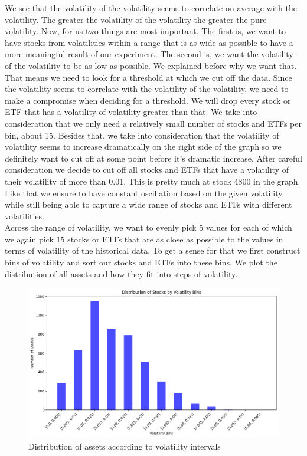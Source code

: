 \documentclass[a4paper,12pt]{report}
\begin{document}
	We see that the volatility of the volatility seems to correlate on average with the volatility. The greater the volatility of the volatility the greater the pure volatility. Now, for us two things are most important. The first is, we want to have stocks from volatilities within a range that is as wide as possible to have a more meaningful result of our experiment. The second is, we want the volatility of the volatility to be as low as possible. We explained before why we want that. That means we need to look for a threshold at which we cut off the data. Since the volatility seems to correlate with the volatility of the volatility, we need to make a compromise when deciding for a threshold. We will drop every stock or ETF that has a volatility of volatility greater than that. We take into consideration that we only need a relatively small number of stocks and ETFs per bin, about 15. Besides that, we take into consideration that the volatility of volatility seems to increase dramatically on the right side of the graph so we definitely want to cut off at some point before it’s dramatic increase. After careful consideration we decide to cut off all stocks and ETFs that have a volatility of their volatility of more than 0.01. This is pretty much at stock 4800 in the graph. Like that we ensure to have constant oscillation based on the given volatility while still being able to capture a wide range of stocks and ETFs with different volatilities. \\
	Across the range of volatility, we want to evenly pick 5 values for each of which we again pick 15 stocks or ETFs that are as close as possible to the values in terms of volatility of the historical data. To get a sense for that we first construct bins of volatility and sort our stocks and ETFs into these bins. We plot the distribution of all assets and how they fit into steps of volatility.\\
		
\begin{figure}[htbp]
  \centering
  \includegraphics[width=\textwidth]{images/bins.png}
  \caption{Distribution of assets according to volatility intervals}
  \label{fig:fullwidth}
\end{figure}
\end{document}
